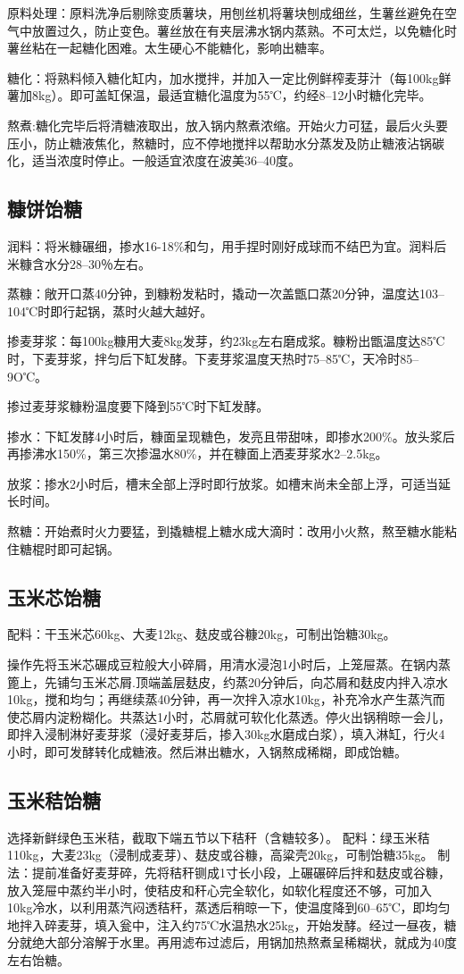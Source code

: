 \documentclass{ctexbook}
\begin{document}
原料处理：原料洗净后剔除变质薯块，用刨丝机将薯块刨成细丝，生薯丝避免在空气中放置过久，防止变色。薯丝放在有夹层沸水锅内蒸熟。不可太烂，以免糖化时薯丝粘在一起糖化困难。太生硬心不能糖化，影响出糖率。

糖化：将熟料倾入糖化缸内，加水搅拌，并加入一定比例鲜榨麦芽汁（每100kg鲜薯加8kg）。即可盖缸保温，最适宜糖化温度为55℃，约经8--12小时糖化完毕。

熬煮:糖化完毕后将清糖液取出，放入锅内熬煮浓缩。开始火力可猛，最后火头要压小，防止糖液焦化，熬糖时，应不停地搅拌以帮助水分蒸发及防止糖液沾锅碳化，适当浓度时停止。一般适宜浓度在波美36--40度。
\subsection{糠饼饴糖}
润料：将米糠碾细，掺水16-18\%和匀，用手捏时刚好成球而不结巴为宜。润料后米糠含水分28--30％左右。

蒸糠：敞开口蒸40分钟，到糠粉发粘时，撬动一次盖甑口蒸20分钟，温度达103--104℃时即行起锅，蒸时火越大越好。

掺麦芽浆：每100kg糠用大麦8kg发芽，约23kg左右磨成浆。糠粉出甑温度达85℃时，下麦芽浆，拌匀后下缸发酵。下麦芽浆温度天热时75--85℃，天冷时85--9O℃。

掺过麦芽浆糠粉温度要下降到55℃时下缸发酵。

掺水：下缸发酵4小时后，糠面呈现糖色，发亮且带甜味，即掺水200\%。放头浆后再掺沸水150\%，第三次掺温水80\%，并在糠面上洒麦芽浆水2--2.5kg。

放浆：掺水2小时后，槽末全部上浮时即行放浆。如槽末尚未全部上浮，可适当延长时间。

熬糖：开始煮时火力要猛，到撬糖棍上糖水成大滴时：改用小火熬，熬至糖水能粘住糖棍时即可起锅。
\subsection{玉米芯饴糖}
配料：干玉米芯60kg、大麦12kg、麸皮或谷糠20kg，可制出饴糖30kg。

操作先将玉米芯碾成豆粒般大小碎屑，用清水浸泡1小时后，上笼屉蒸。在锅内蒸篦上，先铺匀玉米芯屑.顶端盖层麸皮，约蒸20分钟后，向芯屑和麸皮内拌入凉水10kg，搅和均匀；再继续蒸40分钟，再一次拌入凉水10kg，补充冷水产生蒸汽而使芯屑内淀粉糊化。共蒸达1小时，芯屑就可软化化蒸透。停火出锅稍晾一会儿，即拌入浸制淋好麦芽浆（浸好麦芽后，掺入30kg水磨成白浆），填入淋缸，行火4小时，即可发酵转化成糖液。然后淋出糖水，入锅熬成稀糊，即成饴糖。
\subsection{玉米秸饴糖}
选择新鲜绿色玉米秸，截取下端五节以下秸秆（含糖较多）。
配料：绿玉米秸110kg，大麦23kg（浸制成麦芽）、麸皮或谷糠，高粱壳20kg，可制饴糖35kg。
制法：提前准备好麦芽碎，先将秸秆铡成1寸长小段，上碾碾碎后拌和麸皮或谷糠，放入笼屉中蒸约半小时，使秸皮和秆心完全软化，如软化程度还不够，可加入10kg冷水，以利用蒸汽闷透秸秆，蒸透后稍晾一下，使温度降到60--65℃，即均匀地拌入碎麦芽，填入瓮中，注入约75℃水温热水25kg，开始发酵。经过一昼夜，糖分就绝大部分溶解于水里。再用滤布过滤后，用锅加热熬煮呈稀糊状，就成为40度左右饴糖。
\end{document}
